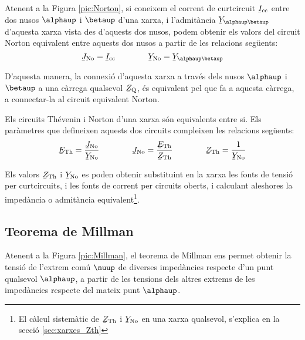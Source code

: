 Atenent a la Figura \vref{pic:Norton}, si coneixem el corrent de
curtcircuit $\cmplx{I}\ped{cc}$ entre dos nusos $\alphaup$ i $\betaup$
d'una xarxa, i l'admitància $\cmplx{Y}_{\alphaup\betaup}$ d'aquesta
xarxa vista des d'aquests dos nusos, podem obtenir els valors del
circuit Norton equivalent entre aquests dos nusos a partir de les
relacions següents:
\begin{equation}
   \cmplx{J}\ped{No} = \cmplx{I}\ped{cc} \qquad\qquad \cmplx{Y}\ped{No} = \cmplx{Y}_{\alphaup\betaup}
\end{equation}

D'aquesta manera, la connexió d'aquesta xarxa a través dels nusos
$\alphaup$ i $\betaup$ a una càrrega qualsevol $\cmplx{Z}\ped{Q}$, és
equivalent pel que fa a aquesta càrrega, a connectar-la al circuit
equivalent Norton.
\begin{center}
    
    \label{pic:Norton}
\end{center}

Els circuits Thévenin i Norton d'una xarxa són equivalents entre si.
Els paràmetres que defineixen aquests dos circuits compleixen les relacions
següents:
\begin{equation}\label{eq:Thevenin-Norton}
   \cmplx{E}\ped{Th} = \frac{\cmplx{J}\ped{No}}{\cmplx{Y}\ped{No}} \qquad\qquad
   \cmplx{J}\ped{No} = \frac{\cmplx{E}\ped{Th}}{\cmplx{Z}\ped{Th}} \qquad\qquad
    \cmplx{Z}\ped{Th} = \frac{1}{\cmplx{Y}\ped{No}}
\end{equation}

Els valors $\cmplx{Z}\ped{Th}$ i  $\cmplx{Y}\ped{No}$ es poden
obtenir substituint en la xarxa  les fonts de tensió  per curtcircuits, i les fonts de corrent per circuits oberts, i calculant
aleshores la impedància o admitància equivalent\footnote{El càlcul sistemàtic de $\cmplx{Z}\ped{Th}$ i  $\cmplx{Y}\ped{No}$ en una xarxa qualsevol, s'explica en la secció \ref{sec:xarxes_Zth}}.

\subsection{Teorema de Millman}\label{sec:millman}

Atenent a la Figura \vref{pic:Millman}, el teorema
de Millman ens permet
obtenir la tensió de l'extrem comú $\nuup$ de diverses impedàncies respecte d'un punt
qualsevol $\alphaup$, a partir de les tensions dels altres extrems de les impedàncies respecte  del mateix punt $\alphaup$.

